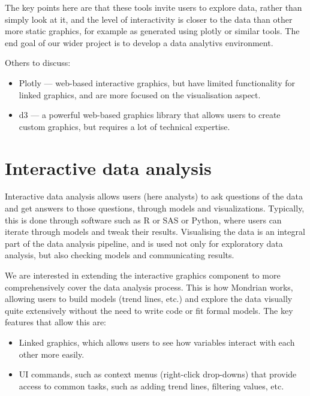 \documentclass{article}
\newcommand{\prog}[1]{{\sf #1}}
\newcommand{\proglang}[1]{\prog{#1}}
\begin{document}
The key points here are that these tools invite users to explore data, rather than simply look at it, and the level of interactivity is closer to the data than other more static graphics, for example as generated using plotly or similar tools.
The end goal of our wider project is to develop a data analytivs environment.

Others to discuss:
\begin{itemize}
  \item Plotly --- web-based interactive graphics, but have limited functionality for linked graphics, and are more focused on the visualisation aspect.
  \item d3 --- a powerful web-based graphics library that allows users to create custom graphics, but requires a lot of technical expertise.
\end{itemize}

\section{Interactive data analysis}
\label{sec:interactive-data-analysis}

Interactive data analysis allows users (here analysts) to ask questions of the data and get answers to those questions, through models and visualizations.
Typically, this is done through software such as \proglang{R} or \proglang{SAS} or \proglang{Python}, where users can iterate through models and tweak their results.
Visualising the data is an integral part of the data analysis pipeline, and is used not only for exploratory data analysis, but also checking models and communicating results.

We are interested in extending the interactive graphics component to more comprehensively cover the data analysis process.
This is how \proglang{Mondrian} works, allowing users to build models (trend lines, etc.) and explore the data visually quite extensively without the need to write code or fit formal models.
The key features that allow this are:
\begin{itemize}
\item Linked graphics, which allows users to see how variables interact with each other more easily.
\item UI commands, such as context menus (right-click drop-downs) that provide access to common tasks, such as adding trend lines, filtering values, etc.
\end{itemize}
\end{document}
